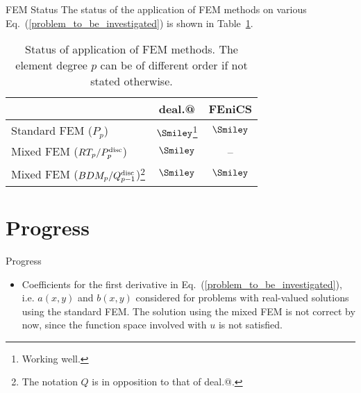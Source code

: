 \documentclass{beamer}
\makeatletter
\newcommand*{\rom}[1]{\expandafter\@slowromancap\romannumeral #1@}
\makeatother
\begin{document}
\begin{frame}{FEM Status}
\vspace{-5em}
The status of the application of FEM methods on various Eq.~(\ref{problem_to_be_investigated}) is shown in Table~\ref{table_status_fem_application}.
\begin{table}[!ht]
\scriptsize
\begin{tabular}{ l | c | c}
 & deal.\rom{2} & FEniCS \\ \hline
 Standard FEM ($P_p$) & $\Smiley$\footnote{Working well.} & $\Smiley$ \\ \hline
 Mixed FEM ($RT_p/P_{p}^{\rm disc}$) & $\Smiley$ & -- \\ \hline
 Mixed FEM ($BDM_p/Q_{p-1}^{\rm disc}$)\footnote{The notation $Q$ is in opposition to that of deal.\rom{2}.} & $\Smiley$ & $\Smiley$
\end{tabular}
\caption{Status of application of FEM methods. The element degree $p$ can be of different order if not stated otherwise.}
\label{table_status_fem_application}
\end{table}
\end{frame}

\section{Progress}
\begin{frame}{Progress}
\vspace{-10.5em}
\begin{itemize}
 \item Coefficients for the first derivative in Eq.~(\ref{problem_to_be_investigated}), i.e. $a(x,y)$ and $b(x,y)$ considered for problems with real-valued solutions using the standard FEM. The solution using the mixed FEM is not correct by now, since the function space involved with $u$ is not satisfied. 
\end{itemize}
\end{frame}

\end{document}
